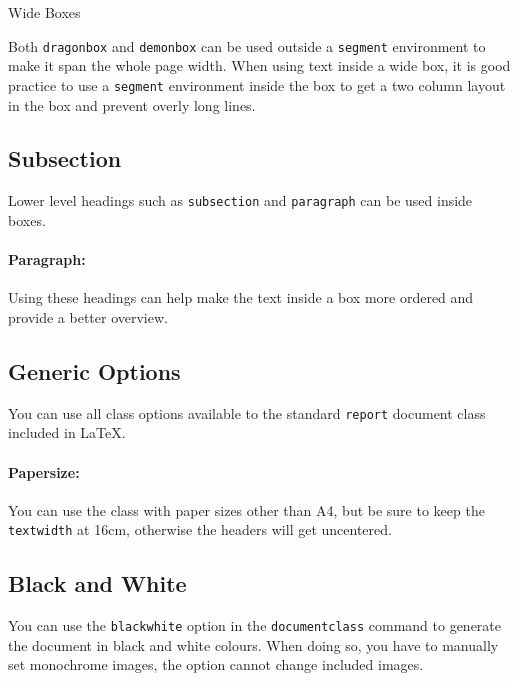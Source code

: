 \documentclass[
]{dragonbane-supplement}
\begin{document}
\begin{dragonbox}{Wide Boxes}
\begin{segment}
Both \texttt{dragonbox} and \texttt{demonbox} can be used outside a \texttt{segment} environment to make it span the whole page width. When using text inside a wide box, it is good practice to use a \texttt{segment} environment inside the box to get a two column layout in the box and prevent overly long lines. 

\subsection{Subsection}
Lower level headings such as \texttt{subsection} and \texttt{paragraph} can be used inside boxes.

\paragraph{Paragraph:}
Using these headings can help make the text inside a box more ordered and provide a better overview.
\end{segment}
\end{dragonbox}


\begin{segment}
\subsection{Generic Options}
You can use all class options available to the standard \texttt{report} document class included in LaTeX.

\paragraph{Papersize:} You can use the class with paper sizes other than A4, but be sure to keep the \texttt{textwidth} at 16cm, otherwise the headers will get uncentered.

\subsection{Black and White}
You can use the \texttt{blackwhite} option in the \texttt{documentclass} command to generate the document in black and white colours. When doing so, you have to manually set monochrome images, the option cannot change included images.
\end{segment}
\end{document}
